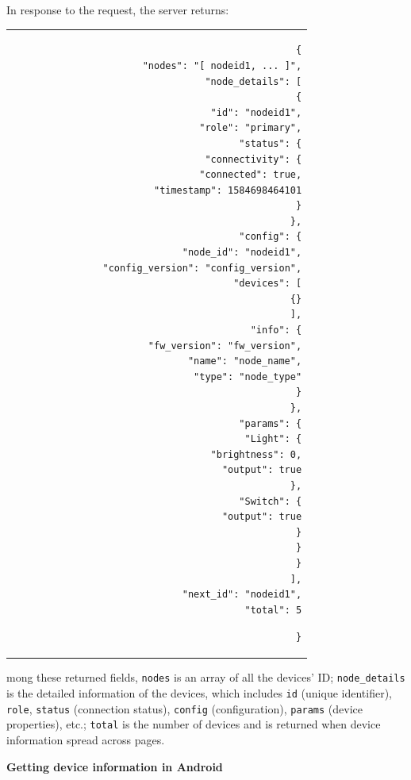 \documentclass[a4paper,12pt,openany]{book}
\renewcommand{\ttfamily}{\fontfamily{pcr}\selectfont}
\renewcommand{\arraystretch}{1}
\newenvironment{codebloc}{ %
    \ttfamily\footnotesize
    \renewcommand{\arraystretch}{1}
}
\newcommand{\note}[2][NOTE]{ %
\vspace{6pt}
\begin{tabular}{b{\textwidth}}
\hline
\fontfamily{phv}\selectfont \textbf{#1}\\
\leftskip 1em #2\\
\hline
\end{tabular}
}
\begin{document}
In response to the request, the server returns:

\begin{codebloc}
\begin{tabular}{d}
\vspace{2pt}
\begin{verbatim}
{
        "nodes": "[ nodeid1, ... ]",
        "node_details": [
        {
            "id": "nodeid1",
            "role": "primary",
            "status": {
            "connectivity": {
                    "connected": true,
                    "timestamp": 1584698464101
                }
            },
            "config": {
                "node_id": "nodeid1",
                "config_version": "config_version",
                "devices": [
                {}
                ],
                "info": {
                    "fw_version": "fw_version",
                    "name": "node_name",
                    "type": "node_type"
                }
            },
            "params": {
                "Light": {
                    "brightness": 0,
                    "output": true
                },
                "Switch": {
                    "output": true
                }
            }
        }
        ],
        "next_id": "nodeid1",
        "total": 5
\end{verbatim}
\verb|}|
\end{tabular}
\end{codebloc}

Among these returned fields, \verb|nodes| is an array of all the devices’ ID; \verb|node_details| is the detailed information of the devices, which includes \verb|id| (unique identifier), \verb|role|, \verb|status| (connection status), \verb|config| (configuration), \verb|params| (device properties), etc.; \verb|total| is the number of devices and is returned when device information spread across pages.

\textbf{Getting device information in Android}

\end{document}
